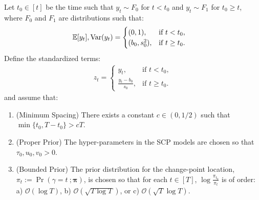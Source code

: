 \begin{assumption}\label{assumption:1}
    Let $t_0 \in [t]$ be the time such that $y_t \sim F_0$ for $t < t_0$ and $y_t \sim F_1$ for $t_0 \geq t$, where $F_0$ and $F_1$ are distributions such that:\vspace{-10pt}
    \begin{align}
        \mathbb{E}[y_t], \text{\normalfont Var}(y_t) &= 
        \begin{cases}
            (0,1), & \text{if } t < t_0, \\
            (b_0,s_0^2), & \text{if } t \geq t_0.
        \end{cases} 
    \end{align}
    Define the standardized terms:\vspace{-10pt}
    \begin{align} \label{eq:normalized}
    z_t = 
        \begin{cases}
            y_t, & \text{if } t < t_0, \\
            \frac{y_t - b_0}{s_0},& \text{if } t \geq t_0.
        \end{cases}
    \end{align}
    and assume that: \vspace{-10pt}
    \begin{enumerate}[label=(\roman*)]
        \item (Minimum Spacing) There exists a constant $c \in (0,1/2)$ such that $\min\{t_0,T-t_0\} > cT$. 
        \item (Proper Prior) The hyper-parameters in the SCP models are chosen so that $\tau_0, u_0, v_0 > 0$.
        \item (Bounded Prior) The prior distribution for the change-point location, $\pi_t := \Pr(\gamma = t \:; \pmb{\pi})$, is chosen so that for each $t\in[T]$, $\log \frac{\pi_{t_0}}{\pi_{t}}$ is of order: a) $\mathcal{O}(\log T)$, b) $\mathcal{O}(\sqrt{T\log T})$, or c) $\mathcal{O}(\sqrt{T}\log T)$.
    \end{enumerate}
\end{assumption}
